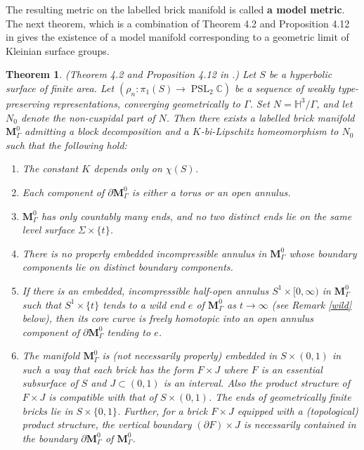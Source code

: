 \documentclass{amsart}
\newtheorem{theorem}{Theorem}[section]
\theoremstyle{definition}
\newcommand{\complexes}{\mathbb{C}}
\newcommand{\pslc}{\operatorname{PSL}_2\complexes}
\newcommand\HHH{{\mathbb H}}
\begin{document}
The 
resulting metric on the labelled brick manifold is called
 {\bf a model metric}. The next theorem, which is a combination of Theorem 4.2 and Proposition 4.12 in \cite{OhD} gives the existence of a model manifold corresponding to a geometric limit of Kleinian surface groups.



\begin{theorem}\label{thm_osa} {\rm (Theorem 4.2 and Proposition 4.12 in \cite{OhD}.)}
	Let $S$ be a  hyperbolic surface of finite area.
	Let $(\rho_n : \pi_1(S) \to \pslc)$ be a sequence of
	weakly type-preserving representations, converging geometrically 
	to $\Gamma$. Set $N = \HHH^3 / \Gamma$, and let $N_0$ denote the non-cuspidal part of $N$.
	Then there exists a labelled brick manifold $\mathbf M^0_\Gamma$ admitting  a block decomposition    and  a $K$-bi-Lipschitz homeomorphism to $N_0$
	such that the following hold: 
	\begin{enumerate}
		\item The constant $K$ depends only on $\chi(S)$.
		\item
		Each component of $\partial \mathbf M^0_\Gamma$ is either a torus or an open annulus.
		\item $\mathbf M^0_\Gamma$ has only countably many ends, and no two distinct ends lie on the same level surface $\Sigma \times \{t\}$.
		\item
		There is no properly embedded incompressible annulus in $\mathbf M^0_\Gamma$ whose boundary components lie on distinct boundary components.
		\item
		If there is an embedded, incompressible half-open annulus $S^1 \times [0,\infty)$ in $\mathbf M^0_\Gamma$ such that $S^1 \times \{t\}$ tends to a wild end $e$ of $\mathbf M^0_\Gamma$ as $t \rightarrow \infty$ (see Remark \ref{wild} below), then its core curve is freely homotopic into an open annulus component of $\partial \mathbf M^0_\Gamma$ tending to $e$.
		\item The manifold $\mathbf M^0_\Gamma$
		 is (not necessarily properly) embedded in $S \times (0,1)$ in such a way that  each brick has the form $F \times J$ where $F$ is an essential subsurface  of $S$ and $J \subset (0,1)$ is an interval. Also the product structure of  $F \times J$ is compatible with that of $S \times (0,1)$. The ends of  geometrically finite bricks lie in $S \times \{0,1\}$. Further, for a brick $F \times J$ equipped with  
		a (topological) product structure, the vertical boundary $(\partial F) \times J$ is necessarily
	contained in the boundary $\partial \mathbf M^0_\Gamma$ of $\mathbf M^0_\Gamma$. 
	\end{enumerate}
\end{theorem}
\end{document}
